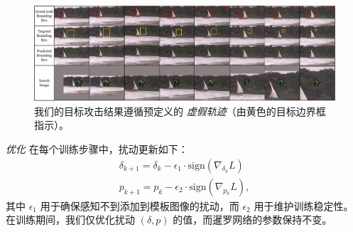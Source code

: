 \begin{figure}[t]
\centering
\includegraphics[width=1.0\textwidth]{Img/attack/vis_v4.pdf}
\caption{我们的目标攻击结果遵循预定义的 \textit{虚假轨迹}（由黄色的目标边界框指示）。}
\label{fig:vis}
\end{figure}

\textit{优化} 在每个训练步骤中，扰动更新如下：
\begin{gather}
\delta_{k+1} = \delta_{k} - \epsilon_1 \cdot \text{sign}(\nabla_{\delta_k}L)\\
p_{k+1} = p_{k} - \epsilon_2 \cdot \text{sign}(\nabla_{p_k}L),
\end{gather}
其中 $\epsilon_1$ 用于确保感知不到添加到模板图像的扰动，而 $\epsilon_2$ 用于维护训练稳定性。
在训练期间，我们仅优化扰动 $(\delta, p)$ 的值，而暹罗网络的参数保持不变。

